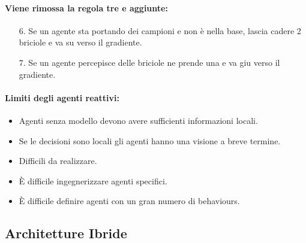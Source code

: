 
\paragraph{Viene rimossa la regola tre e aggiunte:}

\begin{itemize}
  \item [6.] Se un agente sta portando dei campioni e non è nella base, lascia cadere 2 briciole e va su verso il gradiente. 
  \item [7.] Se un agente percepisce delle briciole ne prende una e va giu verso il gradiente.
\end{itemize}


\paragraph{Limiti degli agenti reattivi:}

\begin{itemize}
  \item Agenti senza modello devono avere sufficienti informazioni locali. 
  \item Se le decisioni sono locali gli agenti hanno una visione a breve termine. 
  \item Difficili da realizzare. 
    \item È difficile ingegnerizzare agenti specifici. 
    \item È difficile definire agenti con un gran numero di behaviours.
\end{itemize}

\subsection{Architetture Ibride}

